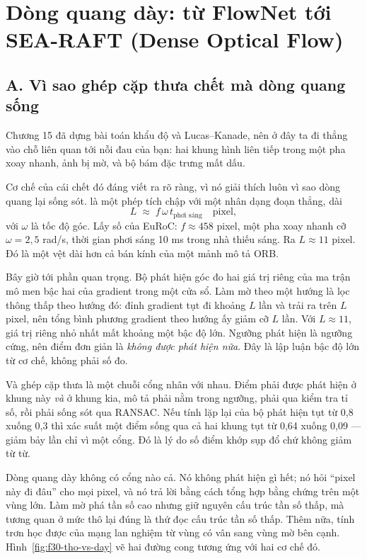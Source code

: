 \documentclass[../../deep_learning.tex]{subfiles}
\begin{document}
\section{Dòng quang dày: từ FlowNet tới SEA-RAFT (Dense Optical Flow)}
\subsection{A. Vì sao ghép cặp thưa chết mà dòng quang sống}
Chương 15 đã dựng bài toán khẩu độ và Lucas--Kanade, nên ở đây ta đi thẳng vào chỗ liên quan tới nỗi đau của bạn: hai khung hình liên tiếp trong một pha xoay nhanh, ảnh bị mờ, và bộ bám đặc trưng mất dấu.

Cơ chế của cái chết đó đáng viết ra rõ ràng, vì nó giải thích luôn vì sao dòng quang lại sống sót.  là một phép tích chập với một nhân dạng đoạn thẳng, dài
\[
L \;\approx\; f\,\omega\,t_{\text{phơi sáng}} \quad \text{pixel},
\]
với \(\omega\) là tốc độ góc. Lấy số của EuRoC: \(f \approx 458\) pixel, một pha xoay nhanh cỡ \(\omega = 2{,}5\) rad/s, thời gian phơi sáng 10 ms trong nhà thiếu sáng. Ra \(L \approx 11\) pixel. Đó là một vệt dài hơn cả bán kính của một mảnh mô tả ORB.

Bây giờ tới phần quan trọng. Bộ phát hiện góc đo hai giá trị riêng của ma trận mô men bậc hai của gradient trong một cửa sổ. Làm mờ theo một hướng là lọc thông thấp theo hướng đó: đỉnh gradient tụt đi khoảng \(L\) lần và trải ra trên \(L\) pixel, nên tổng bình phương gradient theo hướng ấy giảm cỡ \(L\) lần. Với \(L \approx 11\), giá trị riêng nhỏ nhất mất khoảng một bậc độ lớn. Ngưỡng phát hiện là ngưỡng cứng, nên điểm đơn giản là \emph{không được phát hiện nữa}. Đây là lập luận bậc độ lớn từ cơ chế, không phải số đo.

Và ghép cặp thưa là một chuỗi cổng nhân với nhau. Điểm phải được phát hiện ở khung này \emph{và} ở khung kia, mô tả phải nằm trong ngưỡng, phải qua kiểm tra tỉ số, rồi phải sống sót qua RANSAC. Nếu tính lặp lại của bộ phát hiện tụt từ 0,8 xuống 0,3 thì xác suất một điểm sống qua cả hai khung tụt từ 0,64 xuống 0,09 --- giảm bảy lần chỉ vì một cổng. Đó là lý do số điểm khớp sụp đổ chứ không giảm từ từ.

Dòng quang dày không có cổng nào cả. Nó không phát hiện gì hết; nó hỏi ``pixel này đi đâu'' cho mọi pixel, và nó trả lời bằng cách tổng hợp bằng chứng trên một vùng lớn. Làm mờ phá tần số cao nhưng giữ nguyên cấu trúc tần số thấp, mà tương quan ở mức thô lại đúng là thứ đọc cấu trúc tần số thấp. Thêm nữa, tính trơn học được của mạng lan nghiệm từ vùng có vân sang vùng mờ bên cạnh. Hình~\ref{fig:f30-tho-vs-day} vẽ hai đường cong tương ứng với hai cơ chế đó.
\end{document}
